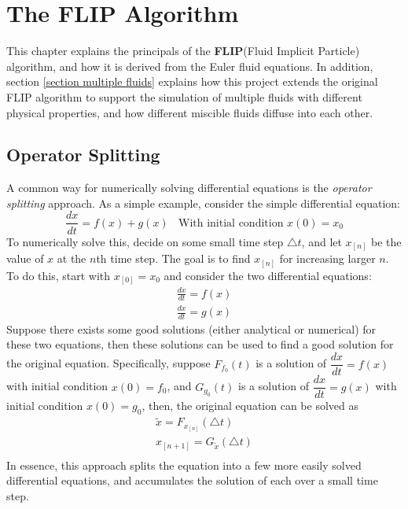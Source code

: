 \chapter{The FLIP Algorithm}
\label{chapter grid}

This chapter explains the principals of the \textbf{FLIP}(Fluid Implicit Particle) algorithm, and how it is derived from the Euler fluid equations. In addition, section \ref{section multiple fluids} explains how this project extends the original FLIP algorithm to support the simulation of multiple fluids with different physical properties, and how different miscible fluids diffuse into each other.


\section{Operator Splitting}
\label{section splitting}
A common way for numerically solving differential equations is the \textit{operator splitting} approach. As a simple example, consider the simple differential equation:
$$
\frac{dx}{dt} = f(x)+g(x) ~~~~\mbox{With initial condition $x(0)=x_0$}
$$
To numerically solve this, decide on some small time step $\triangle t$, and let $x_{[n]}$ be the value of $x$ at the $n$th time step. The goal is to find $x_{[n]}$ for increasing larger $n$. To do this, start with $x_{[0]}=x_0$ and consider the two differential equations:
\begin{equation*}
    \begin{aligned}
        \frac{dx}{dt} = f(x)\\
        \frac{dx}{dt} = g(x)
    \end{aligned}
\end{equation*}
Suppose there exists some good solutions (either analytical or numerical) for these two equations, then these solutions can be used to find a good solution for the original equation. Specifically, suppose $F_{f_0}(t)$ is a solution of $\dfrac{dx}{dt} = f(x)$ with initial condition $x(0)=f_0$, and $G_{g_0}(t)$ is a solution of $\dfrac{dx}{dt} = g(x)$ with initial condition $x(0)=g_0$, then, the original equation can be solved as 
\begin{equation*}
    \begin{aligned}
        \widetilde{x} = F_{x_{[n]}}(\triangle t) \\
        x_{[n+1]} = G_{\widetilde{x}}(\triangle t) \\
    \end{aligned}
\end{equation*}
In essence, this approach splits the equation into a few more easily solved differential equations, and accumulates the solution of each over a small time step. 

